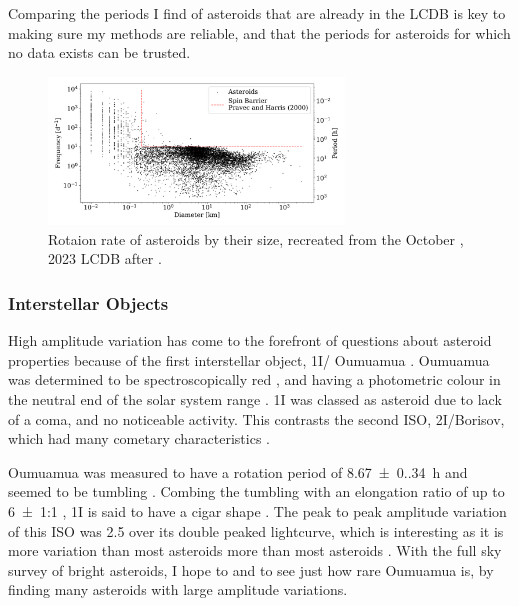 \documentclass{UCreport}
\DeclareRobustCommand{\okina}{%
  \raisebox{\dimexpr\fontcharht\font`A-\height}{%
    \scalebox{0.8}{`}%
  }%
}
\newcommand{\omuamua}{\okina Oumuamua }
\begin{document}
Comparing the periods I find of asteroids that are already in the LCDB is key to making sure my methods are reliable, and that the periods for asteroids for which no data exists can be trusted.

\begin{figure}[t!]
  \centering
  \includegraphics[width=0.7\textwidth]{../Test Code/Testing Figures/Diam-FreqPlot.pdf}
  \caption[Asteroid frequencies vs diameter (LCDB)]{
    Rotaion rate of asteroids by their size, recreated from the  October , 2023 LCDB after \citet{Warner2009}.
  }
  \label{Fig:FreqVsDiam}
\end{figure}

\subsubsection*{Interstellar Objects}
High amplitude variation has come to the forefront of questions about asteroid properties because of the first interstellar object, 1I/\omuamua \citep[see][for a review]{Bannister2019}.
\omuamua was determined to be spectroscopically red \citep{Fitzsimmons2017, Meech2017}, and having a photometric colour in the neutral end of the solar system range \citep{Bannister2017}.
1I was classed as asteroid due to lack of a coma, and no noticeable activity.
This contrasts the second ISO, 2I/Borisov, which had many cometary characteristics \citep[see ][for a review]{Dorofeeva2023}. 

\omuamua was measured to have a rotation period of \qty{8.67(0.34)}{\hour} \citep{Belton2018} and seemed to be tumbling \citep[e.g.][]{Drahus2018,Fraser2018}.
Combing the tumbling with an elongation ratio of up to \qty{6(1)}{}:1 \citep{McNeill2018}, 1I is said to have a cigar shape \citep{Belton2018}.
The peak to peak amplitude variation of this ISO was \qty{2.5}{\mag} \citep{Meech2017} over its double peaked lightcurve, which is interesting as it is more variation than most asteroids more than most asteroids \citep[as seen in the LCDB of][]{Warner2009}.
With the full sky survey of bright asteroids, I hope to and to see just how rare \omuamua is, by finding many asteroids with large amplitude variations.
\end{document}

